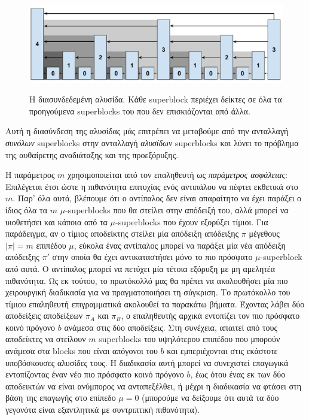 \begin{figure}
  \caption{Η διασυνδεδεμένη αλυσίδα. Κάθε superblock περιέχει δείκτες σε όλα τα προηγούμενα superblocks
  του που δεν επισκιάζονται από άλλα.}
  \centering
  \includegraphics[width=0.7\columnwidth,keepaspectratio]{chapters/work/figures/level-shadows.pdf}
  \label{fig.summary-level-shadows}
\end{figure}

Αυτή η διασύνδεση της αλυσίδας μάς επιτρέπει να μεταβούμε από την ανταλλαγή \emph{συνόλων} superblocks
στην ανταλλαγή \emph{αλυσίδων} superblocks και λύνει το πρόβλημα της αυθαίρετης αναδιάταξης και της
προεξόρυξης.

Η παράμετρος $m$ χρησιμοποιείται από τον επαληθευτή ως \emph{παράμετρος ασφάλειας}: Επιλέγεται έτσι
ώστε η πιθανότητα επιτυχίας ενός αντιπάλου να πέφτει εκθετικά στο $m$. Παρ' όλα αυτά, βλέπουμε ότι
ο αντίπαλος δεν είναι απαραίτητο να έχει παράξει ο ίδιος όλα τα $m$ $\mu$-superblocks που θα στείλει
στην απόδειξή του, αλλά μπορεί να υιοθετήσει και κάποια από τα $\mu$-superblocks που έχουν εξορύξει
τίμιοι. Για παράδειγμα, αν ο τίμιος αποδείκτης
στείλει μία απόδειξη απόδειξης $\pi$ μέγεθους $|\pi| = m$ επιπέδου $\mu$, εύκολα ένας αντίπαλος
μπορεί να παράξει μία νέα απόδειξη απόδειξης $\pi'$ στην οποία θα έχει αντικαταστήσει μόνο το
πιο πρόσφατο $\mu$-superblock από αυτά. Ο αντίπαλος μπορεί να πετύχει μία τέτοια εξόρυξη
με μη αμελητέα πιθανότητα. Ως εκ τούτου, το πρωτόκολλό μας θα πρέπει να ακολουθήσει μία πιο χειρουργική
διαδικασία για να πραγματοποιήσει τη σύγκριση. Το πρωτόκολλο του τίμιου επαληθευτή επιγραμματικά
ακολουθεί τα παρακάτω βήματα. Έχοντας λάβει δύο αποδείξεις αποδείξεων $\pi_A$ και $\pi_B$, ο
επαληθευτής αρχικά εντοπίζει τον πιο πρόσφατο κοινό πρόγονο $b$ ανάμεσα στις δύο αποδείξεις. Στη
συνέχεια, απαιτεί από τους αποδείκτες να στείλουν $m$ superblocks του υψηλότερου επιπέδου που μπορούν
ανάμεσα στα blocks που είναι απόγονοι του $b$ και εμπεριέχονται στις εκάστοτε υποβόσκουσες αλυσίδες τους. Η
διαδικασία αυτή μπορεί να συνεχιστεί επαγωγικά εντοπίζοντας έναν νέο πιο πρόσφατο κοινό πρόγονο $b$,
έως ότου ένας εκ των δύο αποδεικτών να είναι ανύμπορος να ανταπεξέλθει, ή μέχρι η διαδικασία να φτάσει
στη βάση της επαγωγής στο επίπεδο $\mu = 0$ (μπορούμε να δείξουμε ότι αυτά τα δύο γεγονότα είναι
εξαντλητικά με συντριπτική πιθανότητα).

